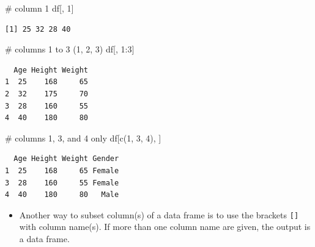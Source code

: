 \documentclass[
  letterpaper,
  DIV=11,
  numbers=noendperiod]{scrreprt}
\newenvironment{Shaded}{\begin{snugshade}}{\end{snugshade}}
\newcommand{\CommentTok}[1]{\textcolor[rgb]{0.37,0.37,0.37}{#1}}
\newcommand{\DecValTok}[1]{\textcolor[rgb]{0.68,0.00,0.00}{#1}}
\newcommand{\FunctionTok}[1]{\textcolor[rgb]{0.28,0.35,0.67}{#1}}
\newcommand{\NormalTok}[1]{\textcolor[rgb]{0.00,0.23,0.31}{#1}}
\newcommand{\SpecialCharTok}[1]{\textcolor[rgb]{0.37,0.37,0.37}{#1}}
\providecommand{\tightlist}{%
  \setlength{\itemsep}{0pt}\setlength{\parskip}{0pt}}\usepackage{longtable,booktabs,array}
\begin{document}
\begin{tcolorbox}[enhanced jigsaw, colbacktitle=quarto-callout-tip-color!10!white, opacitybacktitle=0.6, breakable, left=2mm, leftrule=.75mm, toprule=.15mm, toptitle=1mm, bottomtitle=1mm, colframe=quarto-callout-tip-color-frame, opacityback=0, coltitle=black, arc=.35mm, titlerule=0mm, colback=white, bottomrule=.15mm, title=\textcolor{quarto-callout-tip-color}{\faLightbulb}\hspace{0.5em}{Answer}, rightrule=.15mm]

\begin{Shaded}
\begin{Highlighting}[]
\CommentTok{\# column 1}
\NormalTok{df[, }\DecValTok{1}\NormalTok{]}
\end{Highlighting}
\end{Shaded}

\begin{verbatim}
[1] 25 32 28 40
\end{verbatim}

\begin{Shaded}
\begin{Highlighting}[]
\CommentTok{\# columns 1 to 3 (1, 2, 3)}
\NormalTok{df[, }\DecValTok{1}\SpecialCharTok{:}\DecValTok{3}\NormalTok{]}
\end{Highlighting}
\end{Shaded}

\begin{verbatim}
  Age Height Weight
1  25    168     65
2  32    175     70
3  28    160     55
4  40    180     80
\end{verbatim}

\begin{Shaded}
\begin{Highlighting}[]
\CommentTok{\# columns 1, 3, and 4 only}
\NormalTok{df[}\FunctionTok{c}\NormalTok{(}\DecValTok{1}\NormalTok{, }\DecValTok{3}\NormalTok{, }\DecValTok{4}\NormalTok{), ]}
\end{Highlighting}
\end{Shaded}

\begin{verbatim}
  Age Height Weight Gender
1  25    168     65 Female
3  28    160     55 Female
4  40    180     80   Male
\end{verbatim}

\end{tcolorbox}

\begin{itemize}
\tightlist
\item
  Another way to subset column(s) of a data frame is to use the brackets
  \texttt{{[}{]}} with column name(s). If more than one column name are
  given, the output is a data frame.
\end{itemize}
\end{document}
